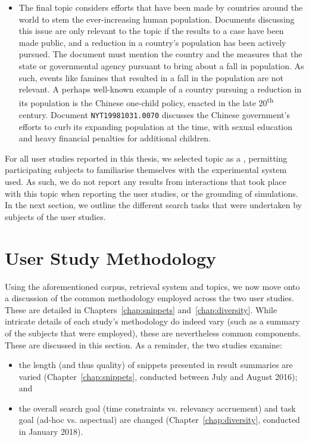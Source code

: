 \begin{itemize}
    \item{ The final topic considers efforts that have been made by countries around the world to stem the ever-increasing human population. Documents discussing this issue are only relevant to the topic if the results to a case have been made public, and a reduction in a country's population has been actively pursued. The document must mention the country and the measures that the state or governmental agency pursuant to bring about a fall in population. As such, events like famines that resulted in a fall in the population are not relevant. A perhaps well-known example of a country pursuing a reduction in its population is the Chinese one-child policy, enacted in the late 20\textsuperscript{th} century. Document \texttt{NYT19981031.0070} discusses the Chinese government's efforts to curb its expanding population at the time, with sexual education and heavy financial penalties for additional children.}
    
\end{itemize}

\vspace*{-3mm}
For all user studies reported in this thesis, we selected topic  as a , permitting participating subjects to familiarise themselves with the experimental system used. As such, we do not report any results from interactions that took place with this topic when reporting the user studies, or the grounding of simulations. In the next section, we outline the different search tasks that were undertaken by subjects of the user studies.

\section{User Study Methodology}\label{sec:methodology:user}
Using the aforementioned corpus, retrieval system and topics, we now move onto a discussion of the common methodology employed across the two user studies. These are detailed in Chapters~\ref{chap:snippets} and~\ref{chap:diversity}. While intricate details of each study's methodology do indeed vary (such as a summary of the subjects that were employed), these are nevertheless common components. These are discussed in this section. As a reminder, the two studies examine:

\begin{itemize}
    \item{the length (and thus quality) of snippets presented in result summaries are varied (Chapter~\ref{chap:snippets}, conducted between July and August 2016); and}

    \item{the overall search goal (time constraints vs. relevancy accruement) and task goal (ad-hoc vs. aspectual) are changed (Chapter~\ref{chap:diversity}, conducted in January 2018).}
\end{itemize}
\vspace*{-4mm}

